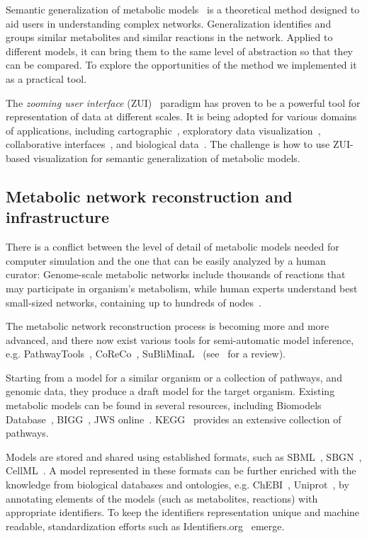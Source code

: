 \documentclass{bmcart}
\begin{document}
Semantic generalization of metabolic models~\cite{Zhukova2014} is a theoretical method designed to aid users in understanding complex networks. Generalization identifies and groups similar metabolites and similar reactions in the network.
Applied to different models, it can bring them to the same level of abstraction so that they can be compared.
To explore the opportunities of the method we implemented it as a practical tool.

The \emph{zooming user interface} (ZUI)~\cite{Bederson1998} paradigm has proven to be a powerful tool for representation of data at different scales. It is being adopted for various domains of applications, including cartographic~\cite{Nivala2008}, exploratory data visualization~\cite{Roberts2005}, collaborative interfaces~\cite{Laufer2011}, and biological data~\cite{Hu2007}. The challenge is how to use ZUI-based visualization for semantic generalization of metabolic models.

\subsection*{Metabolic network reconstruction and infrastructure}
There is a conflict between the level of detail of metabolic models needed for computer simulation and the one that can be easily analyzed by a human curator: Genome-scale metabolic networks include thousands of reactions that may participate in organism's metabolism, while human experts understand best small-sized networks, containing up to hundreds of nodes~\cite{VonLandesberger2011,Herman2000}.

The metabolic network reconstruction process is becoming more and more advanced, and there now exist various tools for semi-automatic model inference, e.g. PathwayTools~\cite{Karp2002}, CoReCo~\cite{Pitkanen2014}, SuBliMinaL~\cite{Swainston2011} (see~\cite{Hamilton2014} for a review).

Starting from a model for a similar organism or a collection of pathways, and genomic data, they produce a draft model for the target organism. Existing metabolic models can be found in several resources, including Biomodels Database~\cite{Li10}, BIGG~\cite{Schellenberger2010}, JWS online~\cite{Snoep2003}. KEGG~\cite{Kanehisa12} provides an extensive collection of pathways. 

Models are stored and shared using established formats, such as SBML~\cite{Hucka2003}, SBGN~\cite{LeNovere2009}, CellML~\cite{Lloyd2004}. A model represented in these formats can be further enriched with the knowledge from biological databases and ontologies, e.g. ChEBI~\cite{deMatos10}, Uniprot~\cite{TheUniProtConsortium2014}, by annotating elements of the models (such as metabolites, reactions) with appropriate identifiers. To keep the identifiers representation unique and machine readable, standardization efforts such as Identifiers.org~\cite{Juty2012} emerge.
\end{document}
